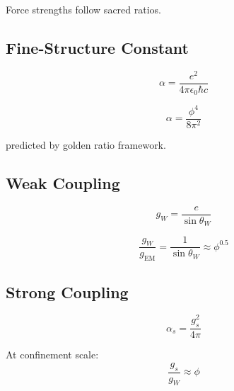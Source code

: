 Force strengths follow sacred ratios.

\subsection{Fine-Structure Constant}

\begin{definition}[Alpha]
\label{def:alpha}
\begin{equation}
\alpha = \frac{e^2}{4\pi\epsilon_0\hbar c}
\end{equation}
\end{definition}

\begin{proposition}
\label{prop:golden-alpha}
\begin{equation}
\alpha = \frac{\phi^4}{8\pi^2}
\end{equation}

predicted by golden ratio framework.
\end{proposition}

\subsection{Weak Coupling}

\begin{equation}
g_W = \frac{e}{\sin\theta_W}
\end{equation}

\begin{theorem}
\label{thm:weak-golden}
\begin{equation}
\frac{g_W}{g_{\text{EM}}} = \frac{1}{\sin\theta_W} \approx \phi^{0.5}
\end{equation}
\end{theorem}

\subsection{Strong Coupling}

\begin{equation}
\alpha_s = \frac{g_s^2}{4\pi}
\end{equation}

\begin{theorem}
\label{thm:strong-golden}
At confinement scale:
\begin{equation}
\frac{g_s}{g_W} \approx \phi
\end{equation}
\end{theorem}

